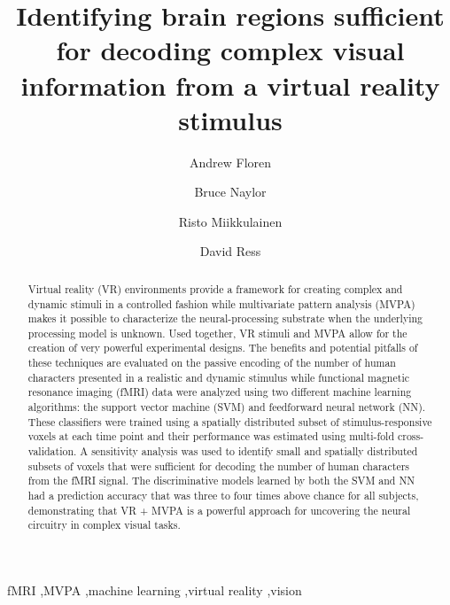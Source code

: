 \documentclass[review,1p,authoryear]{elsarticle}
\begin{document}
\begin{frontmatter}

\title{Identifying brain regions sufficient for decoding complex visual information from a virtual reality stimulus}

\author[ECE,NS]{Andrew Floren}

\author[NS]{Bruce Naylor}

\author[CS]{Risto Miikkulainen}

\author[BCM]{David Ress}

\address[ECE]{Department of Electrical and Computer Engineering}
\address[NS]{Department of Neuroscience}
\address[CS]{Computer Science Department \\ The University of Texas at Austin, Austin, TX 78712 USA}
\address[BCM]{Department of Neuroscience \\ Baylor College of Medicine, Houston, TX 77030 USA}


\begin{abstract}
Virtual reality (VR) environments provide a framework for creating complex and dynamic stimuli in a controlled fashion while multivariate pattern analysis (MVPA) makes it possible to characterize the neural-processing substrate when the underlying processing model is unknown. 
Used together, VR stimuli and MVPA allow for the creation of very powerful experimental designs. 
The benefits and potential pitfalls of these techniques are evaluated on the passive encoding of the number of human characters presented in a realistic and dynamic stimulus while functional magnetic resonance imaging (fMRI) data were analyzed using two different machine learning algorithms: the support vector machine (SVM) and feedforward neural network (NN). 
These classifiers were trained using a spatially distributed subset of stimulus-responsive voxels at each time point and their performance was estimated using multi-fold cross-validation.
A sensitivity analysis was used to identify small and spatially distributed subsets of voxels that were sufficient for decoding the number of human characters from the fMRI signal.
The discriminative models learned by both the SVM and NN had a prediction accuracy that was three to four times above chance for all subjects, demonstrating that VR + MVPA is a powerful approach for uncovering the neural circuitry in complex visual tasks.
\end{abstract}

\begin{keyword}
fMRI \sep MVPA \sep machine learning \sep virtual reality \sep vision
\end{keyword}

\end{frontmatter}
\end{document}
